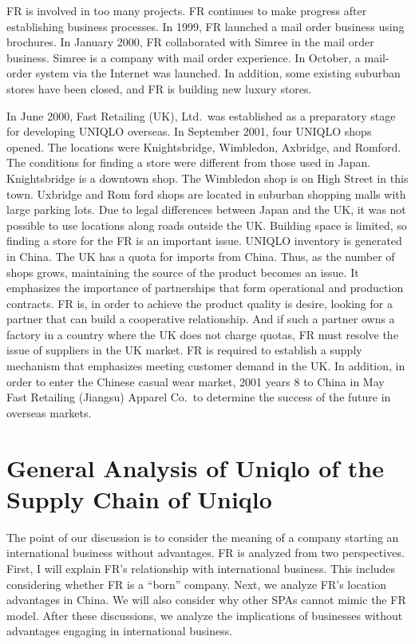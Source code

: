 \documentclass[12pt,]{article}
\begin{document}
FR is involved in too many projects. FR continues to make progress after
establishing business processes. In 1999, FR launched a mail order
business using brochures. In January 2000, FR collaborated with Simree
in the mail order business. Simree is a company with mail order
experience. In October, a mail-order system via the Internet was
launched. In addition, some existing suburban stores have been closed,
and FR is building new luxury stores.

In June 2000, Fast Retailing (UK), Ltd.~was established as a preparatory
stage for developing UNIQLO overseas. In September 2001, four UNIQLO
shops opened. The locations were Knightsbridge, Wimbledon, Axbridge, and
Romford. The conditions for finding a store were different from those
used in Japan. Knightsbridge is a downtown shop. The Wimbledon shop is
on High Street in this town. Uxbridge and Rom ford shops are located in
suburban shopping malls with large parking lots. Due to legal
differences between Japan and the UK, it was not possible to use
locations along roads outside the UK. Building space is limited, so
finding a store for the FR is an important issue. UNIQLO inventory is
generated in China. The UK has a quota for imports from China. Thus, as
the number of shops grows, maintaining the source of the product becomes
an issue. It emphasizes the importance of partnerships that form
operational and production contracts. FR is, in order to achieve the
product quality is desire, looking for a partner that can build a
cooperative relationship. And if such a partner owns a factory in a
country where the UK does not charge quotas, FR must resolve the issue
of suppliers in the UK market. FR is required to establish a supply
mechanism that emphasizes meeting customer demand in the UK. In
addition, in order to enter the Chinese casual wear market, 2001 years 8
to China in May Fast Retailing (Jiangsu) Apparel Co.~to determine the
success of the future in overseas markets.

\hypertarget{general-analysis-of-uniqlo-of-the-supply-chain-of-uniqlo}{%
\section{General Analysis of Uniqlo of the Supply Chain of
Uniqlo}\label{general-analysis-of-uniqlo-of-the-supply-chain-of-uniqlo}}

The point of our discussion is to consider the meaning of a company
starting an international business without advantages. FR is analyzed
from two perspectives. First, I will explain FR's relationship with
international business. This includes considering whether FR is a
``born'' company. Next, we analyze FR's location advantages in China. We
will also consider why other SPAs cannot mimic the FR model. After these
discussions, we analyze the implications of businesses without
advantages engaging in international business.
\end{document}
